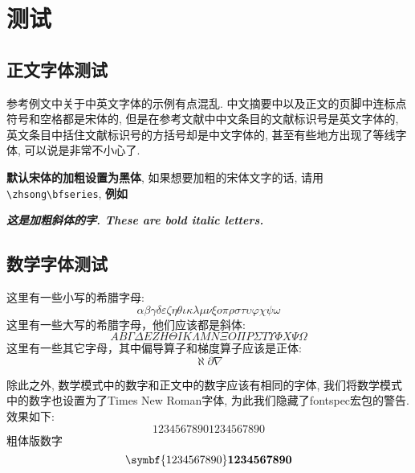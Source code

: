 
\section{测试}

\subsection{正文字体测试}

参考例文中关于中英文字体的示例有点混乱. 中文摘要中以及正文的页脚中连标点符号和空格都是宋体的, 但是在参考文献中中文条目的文献标识号是英文字体的, 英文条目中括住文献标识号的方括号却是中文字体的, 甚至有些地方出现了等线字体, 可以说是非常不小心了.

{\bfseries 默认宋体的加粗设置为黑体}, 如果想要加粗的宋体文字的话, 请用\verb|\zhsong\bfseries|, {\zhsong\bfseries 例如\zhlipsum[1]}

{\bfseries\itshape 这是加粗斜体的字. These are bold italic letters. \zhlipsum[1]\lipsum[1]}

\subsection{数学字体测试}

这里有一些小写的希腊字母:
\begin{equation}
  \alpha \beta \gamma \delta \varepsilon \zeta \eta \theta \iota \kappa \lambda \mu \nu \xi o \pi \rho \sigma \tau \upsilon \varphi \chi \psi \omega
\end{equation}
这里有一些大写的希腊字母，他们应该都是斜体:
\begin{equation}
  A B \Gamma \Delta E Z H \Theta I K \Lambda M N \Xi O \Pi P \Sigma T \Upsilon \varPhi X \Psi \Omega
\end{equation}
这里有一些其它字母，其中偏导算子和梯度算子应该是正体:
\begin{equation}
  \aleph \partial \nabla
\end{equation}

除此之外, 数学模式中的数字和正文中的数字应该有相同的字体, 我们将数学模式中的数字也设置为了Times New Roman字体, 为此我们隐藏了fontspec宏包的警告. 效果如下:
\begin{equation}
  1234567890\text{1234567890}
\end{equation}
粗体版数字
\begin{equation}
  \symbf{1234567890}\text{\textbf{1234567890}}
\end{equation}

